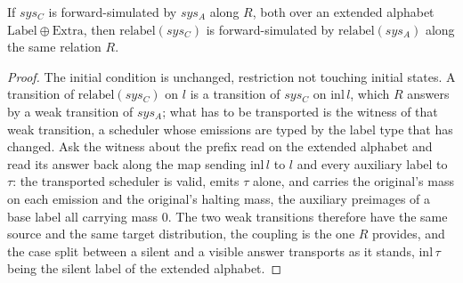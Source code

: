\begin{theorem}
  \label{thm:precong-relabel}
  \leanok
  If $sys_C$ is forward-simulated by $sys_A$ along $R$, both over an extended alphabet $\mathrm{Label} \oplus \mathrm{Extra}$, then $\mathrm{relabel}(sys_C)$ is forward-simulated by $\mathrm{relabel}(sys_A)$ along the same relation $R$.
\end{theorem}

\begin{proof}\leanok
  The initial condition is unchanged, restriction not touching initial states.
  A transition of $\mathrm{relabel}(sys_C)$ on $l$ is a transition of $sys_C$ on $\mathrm{inl}\,l$, which $R$ answers by a weak transition of $sys_A$; what has to be transported is the witness of that weak transition, a scheduler whose emissions are typed by the label type that has changed.
  Ask the witness about the prefix read on the extended alphabet and read its answer back along the map sending $\mathrm{inl}\,l$ to $l$ and every auxiliary label to $\tau$: the transported scheduler is valid, emits $\tau$ alone, and carries the original's mass on each emission and the original's halting mass, the auxiliary preimages of a base label all carrying mass $0$.
  The two weak transitions therefore have the same source and the same target distribution, the coupling is the one $R$ provides, and the case split between a silent and a visible answer transports as it stands, $\mathrm{inl}\,\tau$ being the silent label of the extended alphabet.
\end{proof}
